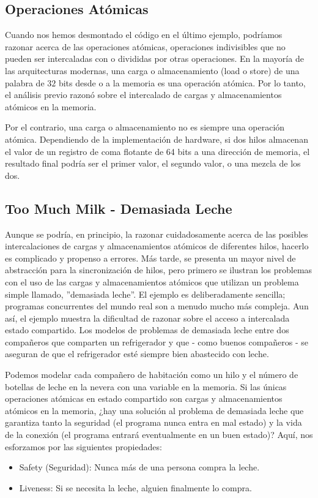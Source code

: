 \documentclass[10pt]{book}
\begin{document}
\subsection{Operaciones Atómicas}
Cuando nos hemos desmontado el código en el último ejemplo, podríamos razonar acerca de las operaciones atómicas, operaciones indivisibles que no pueden ser intercaladas con o divididas por otras operaciones. En la mayoría de las arquitecturas modernas, una carga o almacenamiento (load o store) de una palabra de $32$ bits desde o a la memoria es una operación atómica. Por lo tanto, el análisis previo razonó sobre el intercalado de cargas y almacenamientos atómicos en la memoria.

Por el contrario, una carga o almacenamiento no es siempre una operación atómica. Dependiendo de la implementación de hardware, si dos hilos almacenan el valor de un registro de coma flotante de 64 bits a una dirección de memoria, el resultado final podría ser el primer valor, el segundo valor, o una mezcla de los dos.

\subsection{Too Much Milk - Demasiada Leche}
Aunque se podría, en principio, la razonar cuidadosamente acerca de las posibles intercalaciones de cargas y almacenamientos atómicos de diferentes hilos, hacerlo es complicado y propenso a errores. Más tarde, se presenta un mayor nivel de abstracción para la sincronización de hilos, pero primero se ilustran los problemas con el uso de las cargas y almacenamientos atómicos que utilizan un problema simple llamado, ''demasiada leche''. El ejemplo es deliberadamente sencilla; programas concurrentes del mundo real son a menudo mucho más compleja. Aun así, el ejemplo muestra la dificultad de razonar sobre el acceso a intercalada estado compartido. Los modelos de problemas de demasiada leche entre dos compañeros que comparten un refrigerador y que - como buenos compañeros - se aseguran de que el refrigerador esté siempre bien abastecido con leche.

Podemos modelar cada compañero de habitación como un hilo y el número de botellas de leche en la nevera con una variable en la memoria. Si las únicas operaciones atómicas en estado compartido son cargas y almacenamientos atómicos en la memoria, ¿hay una solución al problema de demasiada leche que garantiza tanto la seguridad (el programa nunca entra en mal estado) y la vida de la conexión (el programa entrará eventualmente en un buen estado)? Aquí, nos esforzamos por las siguientes propiedades:
\begin{itemize}
\item Safety (Seguridad): Nunca más de una persona compra la leche.
\item Liveness: Si se necesita la leche, alguien finalmente lo compra.
\end{itemize}
\end{document}
